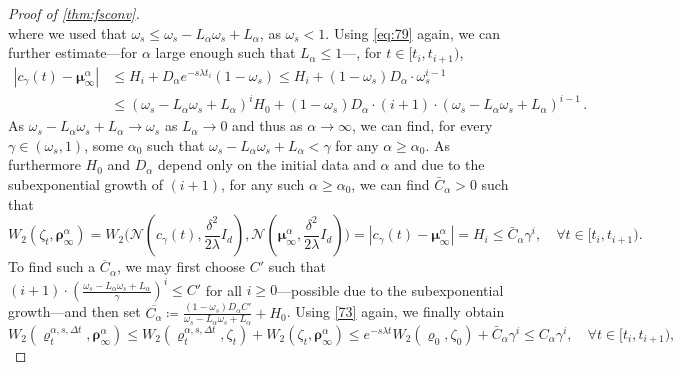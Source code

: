 \documentclass[reqno]{amsart}
\numberwithin{algorithm}{section}
\newcommand{\mc}[1]{\mathcal{#1}}
\begin{document}
{\begin{proof}[Proof of \cref{thm:fsconv}]
\begin{equation}
    \end{equation}
    where we used that $\omega_s \leq \omega_s - L_\alpha \omega_s + L_\alpha$, as $\omega_s < 1$.
    Using \cref{eq:79} again, we can further estimate---for $\alpha$ large enough such that $L_\alpha \leq 1$---, for $t \in [t_i, t_{i+1})$,
    \begin{equation}\label{eq:81}
        \begin{split}
            |c_\gamma(t) - \boldsymbol\mu_\infty^\alpha| &\leq H_i + D_\alpha e^{-s\lambda t_i} (1 - \omega_s) \leq  H_i + (1 - \omega_s) D_\alpha \cdot \omega_s^{i-1} \\
            &\leq (\omega_s - L_\alpha \omega_s + L_\alpha)^i H_0 + {(1 - \omega_s) D_\alpha \cdot (i+1) \cdot (\omega_s - L_\alpha \omega_s + L_\alpha)^{i-1}}\,.
        \end{split}
    \end{equation}
    As $\omega_s - L_\alpha \omega_s + L_\alpha \to \omega_s$ as $L_\alpha \to 0$ and thus as $\alpha \to \infty$, we can find, for every $\gamma \in ( \omega_s, 1)$, some $\alpha_0$ such that $\omega_s - L_\alpha \omega_s + L_\alpha < \gamma$ for any $\alpha \geq \alpha_0$. As furthermore $H_0$  and $D_\alpha$ depend only on the initial data and $\alpha$ and due to the subexponential growth of $(i+1)$, for any such $\alpha \geq \alpha_0$, we can find $\bar{C}_\alpha > 0$ such that
    \begin{equation*}
        W_2(\zeta_{t}, \boldsymbol\rho_\infty^\alpha) = W_2\Big(\mc{N}(c_\gamma(t), \frac{\delta^2}{2\lambda} I_d), \mc{N}(\boldsymbol\mu_\infty^\alpha, \frac{\delta^2}{2\lambda} I_d)\Big) = |c_\gamma(t) - \boldsymbol\mu_\infty^\alpha| = H_i \leq \bar{C}_\alpha \gamma^i, \quad \forall t \in [t_i, t_{i+1}).
    \end{equation*}
    To find such a $\overline{C}_\alpha$, we may first choose $C'$ such that $(i+1) \cdot (\frac{\omega_s - L_\alpha \omega_s + L_\alpha}{\gamma})^{i} \leq C'$ for all $i \geq 0$---possible due to the subexponential growth---and then set $\overline{C_\alpha} \coloneqq \frac{(1-\omega_s)D_\alpha C'}{\omega_s - L_\alpha \omega_s + L_\alpha} + H_0$.
    Using \cref{73} again, we finally obtain
    \begin{equation*}
        W_2(\varrho_{t}^{\alpha,s,\Delta t}, \boldsymbol\rho_\infty^\alpha) \leq W_2(\varrho_{t}^{\alpha,s,\Delta t}, \zeta_{t}) + W_2(\zeta_{t}, \boldsymbol\rho_\infty^\alpha) \leq e^{-s\lambda t} W_2(\varrho_0, \zeta_0) + \bar{C}_\alpha \gamma^i \leq C_\alpha \gamma^i, \quad \forall t \in [t_i, t_{i+1}),

\end{equation*}
\end{proof}}
\end{document}
